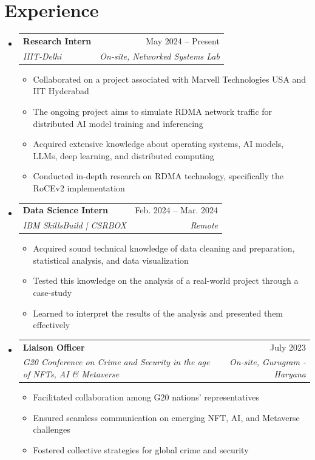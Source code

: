 \documentclass[letterpaper,9pt]{article}
\makeatletter
\newcommand{\resumeItem}[1]{
  \item\small{
    {#1 \vspace{-2pt}}
  }
}
\newcommand{\resumeSubheading}[4]{
  \vspace{-2pt}\item
    \begin{tabular*}{0.97\textwidth}[t]{l@{\extracolsep{\fill}}r}
      \textbf{#1} & #2 \\
      \textit{\small#3} & \textit{\small #4} \\
    \end{tabular*}\vspace{-7pt}
}
\newcommand{\resumeSubHeadingListStart}{\begin{itemize}[leftmargin=0.15in, label={}]}
\newcommand{\resumeSubHeadingListEnd}{\end{itemize}}
\newcommand{\resumeItemListStart}{\begin{itemize}}
\newcommand{\resumeItemListEnd}{\end{itemize}\vspace{-5pt}}
\makeatother
\begin{document}
\section{Experience}
  \resumeSubHeadingListStart
    \resumeSubheading
      {Research Intern}{May 2024 -- Present}
      {IIIT-Delhi}{On-site, Networked Systems Lab}
      \resumeItemListStart
        \resumeItem{Collaborated on a project associated with Marvell Technologies USA and IIT Hyderabad}
        \resumeItem{The ongoing project aims to simulate RDMA network traffic for distributed AI model training and inferencing}
        \resumeItem{Acquired extensive knowledge about operating systems, AI models, LLMs, deep learning, and distributed computing}
        \resumeItem{Conducted in-depth research on RDMA technology, specifically the RoCEv2 implementation}
      \resumeItemListEnd

    \resumeSubheading
      {Data Science Intern}{Feb. 2024 -- Mar. 2024}
      {IBM SkillsBuild | CSRBOX}{Remote}
      \resumeItemListStart
        \resumeItem{Acquired sound technical knowledge of data cleaning and preparation, statistical analysis, and data visualization}
        \resumeItem{Tested this knowledge on the analysis of a real-world project through a case-study}
        \resumeItem{Learned to interpret the results of the analysis and presented them effectively}
      \resumeItemListEnd

    \resumeSubheading
      {Liaison Officer}{July 2023}
      {G20 Conference on Crime and Security in the age of NFTs, AI \& Metaverse}{On-site, Gurugram - Haryana}
      \resumeItemListStart
        \resumeItem{Facilitated collaboration among G20 nations' representatives}
        \resumeItem{Ensured seamless communication on emerging NFT, AI, and Metaverse challenges}
        \resumeItem{Fostered collective strategies for global crime and security}
    \resumeItemListEnd
  \resumeSubHeadingListEnd
\end{document}
